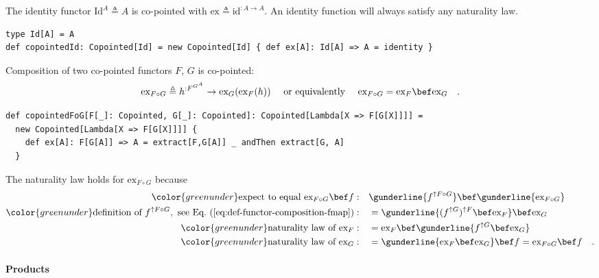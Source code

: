 The identity functor $\text{Id}^{A}\triangleq A$ is co-pointed with
$\text{ex}\triangleq\text{id}^{:A\rightarrow A}$. An identity function
will always satisfy any naturality law.
\begin{lstlisting}
type Id[A] = A
def copointedId: Copointed[Id] = new Copointed[Id] { def ex[A]: Id[A] => A = identity }
\end{lstlisting}

Composition of two co-pointed functors $F$, $G$ is co-pointed:
\[
\text{ex}_{F\circ G}\triangleq h^{:F^{G^{A}}}\rightarrow\text{ex}_{G}(\text{ex}_{F}(h))\quad\text{ or equivalently }\quad\text{ex}_{F\circ G}=\text{ex}_{F}\bef\text{ex}_{G}\quad.
\]
\begin{lstlisting}
def copointedFoG[F[_]: Copointed, G[_]: Copointed]: Copointed[Lambda[X => F[G[X]]]] =     
  new Copointed[Lambda[X => F[G[X]]]] {
    def ex[A]: F[G[A]] => A = extract[F,G[A]] _ andThen extract[G, A]
  }
\end{lstlisting}
The naturality law holds for $\text{ex}_{F\circ G}$ because
\begin{align*}
{\color{greenunder}\text{expect to equal }\text{ex}_{F\circ G}\bef f:}\quad & \gunderline{f^{\uparrow F\circ G}}\bef\gunderline{\text{ex}_{F\circ G}}\\
{\color{greenunder}\text{definition of }\ensuremath{f^{\uparrow F\circ G}},\text{ see Eq.~(\ref{eq:def-functor-composition-fmap})}:}\quad & =\gunderline{(f^{\uparrow G})^{\uparrow F}\bef\text{ex}_{F}}\bef\text{ex}_{G}\\
{\color{greenunder}\text{naturality law of }\text{ex}_{F}:}\quad & =\text{ex}_{F}\bef\gunderline{f^{\uparrow G}\bef\text{ex}_{G}}\\
{\color{greenunder}\text{naturality law of }\text{ex}_{G}:}\quad & =\gunderline{\text{ex}_{F}\bef\text{ex}_{G}}\bef f=\text{ex}_{F\circ G}\bef f\quad.
\end{align*}


\paragraph{Products}

